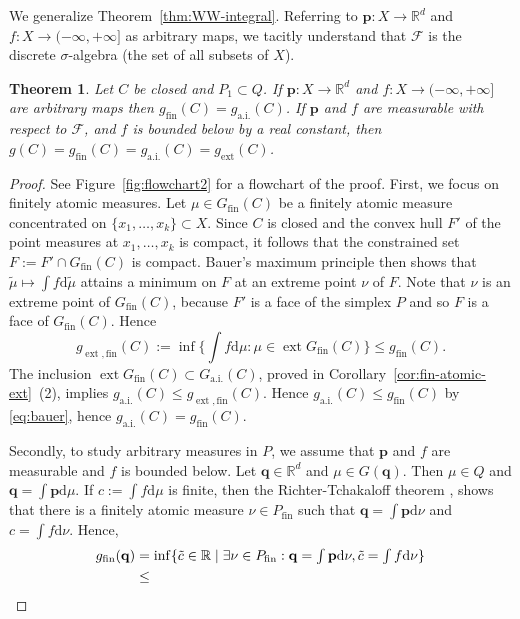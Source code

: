 \documentclass[a4paper,11pt,reqno]{amsart}
\numberwithin{equation}{section}
\theoremstyle{plain}
\newtheorem{theorem}{Theorem}[section]
\theoremstyle{definition}
\newcommand{\bp}{\mathbf{p}}
\newcommand{\bq}{\mathbf{q}}
\newcommand{\cF}{\mathcal{F}} %
\newcommand{\dd}{\mathrm{d}} %
\newcommand{\R}{\mathbb{R}} %
\DeclareMathOperator{\ext}{ext} %
\newcommand\ait{\mathrm{a.i.}}
\newcommand\extt{\mathrm{ext}}
\newcommand\fint{\mathrm{fin}}
\begin{document}
%
We generalize Theorem~\ref{thm:WW-integral}. Referring to $\bp\colon X\to\R^d$ and 
$f\colon X\to(-\infty,+\infty]$ as arbitrary maps, we tacitly understand that $\cF$ 
is the discrete $\sigma$-algebra (the set of all subsets of $X$).
\par
%
\begin{theorem}\label{thm:RTR}
Let $C$ be closed and $P_1\subset Q$. If $\bp\colon X\to\R^d$ and 
$f\colon X\to(-\infty,+\infty]$ are arbitrary maps then $g_\fint(C)=g_\ait(C)$. If 
$\bp$ and $f$ are measurable with respect to $\cF$, and $f$ is bounded below by a 
real constant, then $g(C)=g_\fint(C)=g_\ait(C)=g_\extt(C)$.
\end{theorem}
%
\begin{proof}
See Figure~\ref{fig:flowchart2} for a flowchart of the proof.
First, we focus on finitely atomic measures. Let $\mu\in G_\fint(C)$ be a finitely 
atomic measure concentrated on $\{x_1,\dots,x_k\}\subset X$. Since $C$ is closed 
and the convex hull $F'$ of the point measures at $x_1,\dots,x_k$ is compact, it 
follows that the constrained set $F:=F'\cap G_\fint(C)$ is compact. Bauer's maximum 
principle then shows that $\tilde\mu\mapsto\int f\dd\tilde\mu$ attains a minimum on 
$F$ at an extreme point $\nu$ of $F$. Note that $\nu$ is an extreme point of 
$G_\fint(C)$, because $F'$ is a face of the simplex $P$ and so $F$ is a face of 
$G_\fint(C)$. Hence
\begin{equation}\label{eq:bauer}\textstyle
g_{\ext,\fint}(C)
:=\inf\{ \int f\dd\mu : \mu\in\ext G_\fint(C)\}
\leq g_\fint(C).
\end{equation}
The inclusion $\ext G_\fint(C)\subset G_\ait(C)$, proved in 
Corollary~\ref{cor:fin-atomic-ext}~(2), implies $g_\ait(C)\leq g_{\ext,\fint}(C)$. 
Hence $g_\ait(C)\leq g_\fint(C)$ by \eqref{eq:bauer}, hence $g_\ait(C)=g_\fint(C)$.
\par
%
Secondly, to study arbitrary measures in $P$, we assume that $\bp$ and $f$ are 
measurable and $f$ is bounded below. Let $\bq\in\R^d$ and $\mu\in G(\bq)$. Then 
$\mu\in Q$ and $\bq=\int\bp\dd\mu$. If $c:=\int f\dd\mu$ is finite, then the 
Richter-Tchakaloff theorem \cite[Theorem 1.24]{schmuedgen17}, \cite[Lemma~3.1]{shapiro01} 
shows that there is a finitely atomic measure $\nu\in P\!_\fint$ such that 
$\bq=\int\bp\dd\nu$ and $c=\int f\dd\nu$. Hence, 
\begin{align*}
g_\fint(\bq)
&=\textstyle  
 \inf\{\tilde c\in\R\mid \exists \nu\in P\!_\fint
 : \bq=\int\bp\dd\nu, \tilde c=\int f\dd\nu\}\\
&\leq\textstyle  

\end{align*}
\end{proof}
\end{document}
